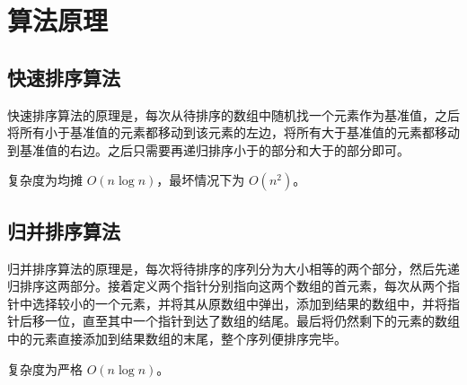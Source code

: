 \section{算法原理}

\subsection{快速排序算法}

快速排序算法的原理是，每次从待排序的数组中随机找一个元素作为基准值，之后将所有小于基准值的元素都移动到该元素的左边，将所有大于基准值的元素都移动到基准值的右边。之后只需要再递归排序小于的部分和大于的部分即可。 

复杂度为均摊 $O(n \log n)$，最坏情况下为 $O(n^2)$。 

\subsection{归并排序算法}

归并排序算法的原理是，每次将待排序的序列分为大小相等的两个部分，然后先递归排序这两部分。接着定义两个指针分别指向这两个数组的首元素，每次从两个指针中选择较小的一个元素，并将其从原数组中弹出，添加到结果的数组中，并将指针后移一位，直至其中一个指针到达了数组的结尾。最后将仍然剩下的元素的数组中的元素直接添加到结果数组的末尾，整个序列便排序完毕。 

复杂度为严格 $O(n \log n)$。
